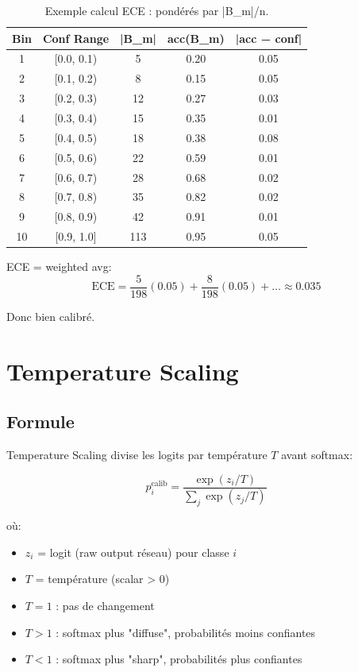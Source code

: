 \documentclass[12pt,a4paper,oneside]{report}
\begin{document}
\begin{table}[H]
\centering
\begin{tabular}{|c|c|c|c|c|}
\hline
\textbf{Bin} & \textbf{Conf Range} & \textbf{|B_m|} & 
\textbf{acc(B_m)} & \textbf{|acc − conf|} \\
\hline
1 & [0.0, 0.1) & 5 & 0.20 & 0.05 \\
2 & [0.1, 0.2) & 8 & 0.15 & 0.05 \\
3 & [0.2, 0.3) & 12 & 0.27 & 0.03 \\
4 & [0.3, 0.4) & 15 & 0.35 & 0.01 \\
5 & [0.4, 0.5) & 18 & 0.38 & 0.08 \\
6 & [0.5, 0.6) & 22 & 0.59 & 0.01 \\
7 & [0.6, 0.7) & 28 & 0.68 & 0.02 \\
8 & [0.7, 0.8) & 35 & 0.82 & 0.02 \\
9 & [0.8, 0.9) & 42 & 0.91 & 0.01 \\
10 & [0.9, 1.0] & 113 & 0.95 & 0.05 \\
\hline
\end{tabular}
\caption{Exemple calcul ECE : pondérés par |B_m|/n.}
\label{tab:ece_example}
\end{table}

ECE = weighted avg:
$$\text{ECE} = \frac{5}{198}(0.05) + \frac{8}{198}(0.05) + \ldots 
\approx 0.035$$

Donc bien calibré.

\section{Temperature Scaling}

\subsection{Formule}

Temperature Scaling divise les logits par température $T$ avant softmax:

\begin{equation}
p_i^{\text{calib}} = \frac{\exp(z_i / T)}{\sum_j \exp(z_j / T)}
\label{eq:temp_scaling}
\end{equation}

où:
\begin{itemize}
    \item $z_i$ = logit (raw output réseau) pour classe $i$
    \item $T$ = température (scalar > 0)
    \item $T = 1$ : pas de changement
    \item $T > 1$ : softmax plus "diffuse", probabilités moins 
          confiantes
    \item $T < 1$ : softmax plus "sharp", probabilités plus 
          confiantes
\end{itemize}
\end{document}

